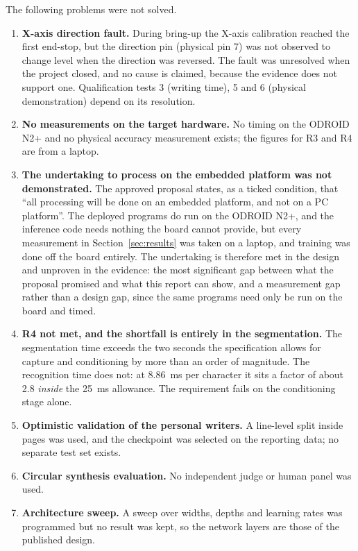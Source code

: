         The following problems were not solved.

        \begin{enumerate}
          \item \textbf{X-axis direction fault.} During bring-up the X-axis calibration reached the first end-stop, but the direction pin (physical pin 7) was not observed to change level when the direction was reversed.
          The fault was unresolved when the project closed, and no cause is claimed, because the evidence does not support one.
          Qualification tests 3 (writing time), 5 and 6 (physical demonstration) depend on its resolution.
          \item \textbf{No measurements on the target hardware.} No timing on the ODROID N2+ and no physical accuracy measurement exists; the figures for R3 and R4 are from a laptop.
          \item \textbf{The undertaking to process on the embedded platform was not demonstrated.} The approved proposal states, as a ticked condition, that ``all processing will be done on an embedded platform, and not on a PC platform''.
          The deployed programs do run on the ODROID N2+, and the inference code needs nothing the board cannot provide, but every measurement in Section~\ref{sec:results} was taken on a laptop, and training was done off the board entirely.
          The undertaking is therefore met in the design and unproven in the evidence: the most significant gap between what the proposal promised and what this report can show, and a measurement gap rather than a design gap, since the same programs need only be run on the board and timed.
          \item \textbf{R4 not met, and the shortfall is entirely in the segmentation.} The segmentation time exceeds the two seconds the specification allows for capture and conditioning by more than an order of magnitude. The recognition time does not: at 8.86~ms per character it sits a factor of about 2.8 \emph{inside} the 25~ms allowance. The requirement fails on the conditioning stage alone.
          \item \textbf{Optimistic validation of the personal writers.} A line-level split inside pages was used, and the checkpoint was selected on the reporting data; no separate test set exists.
          \item \textbf{Circular synthesis evaluation.} No independent judge or human panel was used.
          \item \textbf{Architecture sweep.} A sweep over widths, depths and learning rates was programmed but no result was kept, so the network layers are those of the published design.

\end{enumerate}
